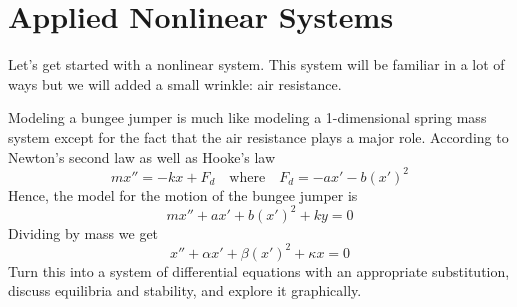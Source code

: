 \section{Applied Nonlinear Systems}
Let's get started with a nonlinear system.  This system will be familiar in a lot of ways
but we will added a small wrinkle: air resistance.





\begin{problem}
    Modeling a bungee jumper is much like modeling a 1-dimensional spring mass system
    except for the fact that
    the air resistance plays a major role.  According to Newton's second law as well as
    Hooke's law
    \[ m x'' = -kx + F_d \quad \text{where} \quad F_d = -a x' -b \left( x' \right)^2 \]
    Hence, the model for the motion of the bungee jumper is
    \[ mx'' + ax' + b\left( x' \right)^2 + ky = 0 \]
    Dividing by mass we get
    \[ x'' + \alpha x' + \beta \left( x' \right)^2 + \kappa x = 0 \]
    Turn this into a system of differential equations with an appropriate substitution,
    discuss equilibria and stability, and explore it graphically.
\end{problem}



